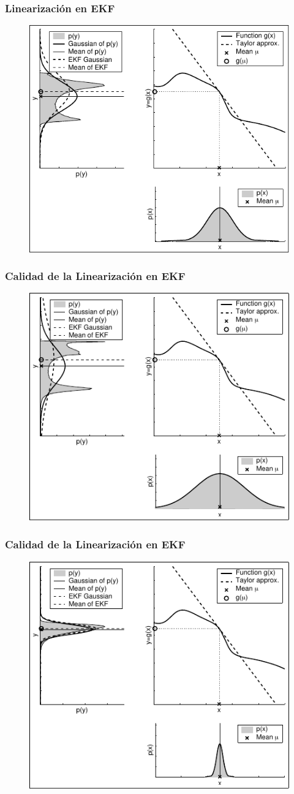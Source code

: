 \begin{frame}
	\frametitle{Linearización en EKF}
	
	\begin{figure}[!h]
		\includegraphics[width=0.5\columnwidth]{./images/linearization_applied_by_ekf.pdf}
	\end{figure}
\end{frame}


\begin{frame}
	\frametitle{Calidad de la Linearización en EKF}
	
	\begin{figure}[!h]
		\includegraphics[width=0.5\columnwidth]{./images/dependency_approximation_quality_spread.pdf}
	\end{figure}
\end{frame}

\begin{frame}
	\frametitle{Calidad de la Linearización en EKF}
	
	\begin{figure}[!h]
		\includegraphics[width=0.5\columnwidth]{./images/dependency_approximation_quality_narrow.pdf}
	\end{figure}
\end{frame}


